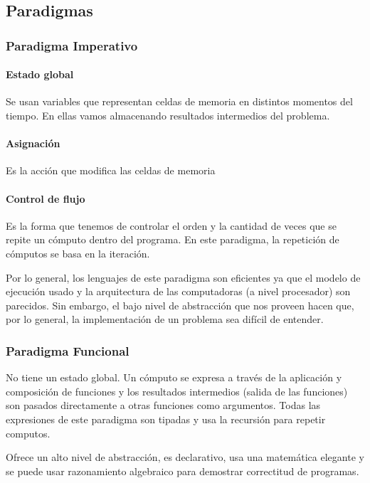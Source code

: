 \documentclass[10pt,a4paper]{article}
\begin{document}
\subsection{Paradigmas}
\subsubsection{Paradigma Imperativo}

\paragraph{Estado global} Se usan variables que representan celdas de memoria en distintos momentos del tiempo. En ellas vamos almacenando resultados intermedios del problema.

\paragraph{Asignación} Es la acción que modifica las celdas de memoria

\paragraph{Control de flujo} Es la forma que tenemos de controlar el orden y la cantidad de veces que se repite un cómputo dentro del programa. En este paradigma, la repetición de cómputos se basa en la iteración.

\vspace*{5mm}

Por lo general, los lenguajes de este paradigma son eficientes ya que el modelo de ejecución usado y la arquitectura de las computadoras (a nivel procesador) son parecidos. Sin embargo, el bajo nivel de abstracción que nos proveen hacen que, por lo general, la implementación de un problema sea difícil de entender.

\subsubsection{Paradigma Funcional}
No tiene un estado global. Un cómputo se expresa a través de la aplicación y composición de funciones y los resultados intermedios (salida de las funciones) son pasados directamente a otras funciones como argumentos. Todas las expresiones de este paradigma son tipadas y usa la recursión para repetir computos.

Ofrece un alto nivel de abstracción, es declarativo, usa una matemática elegante y se puede usar razonamiento algebraico para demostrar correctitud de programas.
\end{document}
